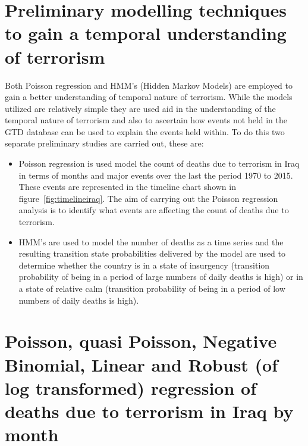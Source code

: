 \section{Preliminary modelling techniques to gain a temporal understanding of terrorism}
Both Poisson regression and HMM's (Hidden Markov Models) are employed to gain a better understanding of temporal nature of terrorism. While the models utilized are relatively simple they are used aid in the understanding of the temporal nature of terrorism and also to ascertain how events not held in the GTD database can be used to explain the events held within. To do this two separate preliminary studies are carried out, these are:
\begin{itemize}
\item Poisson regression is used model the count of deaths due to terrorism in Iraq in terms of months and major events over the last the period 1970 to 2015. These events are  represented in the timeline chart shown in figure~\ref{fig:timelineiraq}. The aim of carrying out the Poisson regression analysis is to identify what events are affecting the count of deaths due to terrorism. 
\item HMM's are used to model the number of deaths as a time series and the resulting transition state probabilities delivered by the model are used to determine whether the country is in a state of insurgency (transition probability of being in a period of large numbers of daily deaths is high) or in a state of relative calm (transition probability of being in a period of low numbers of daily deaths is high).
\end{itemize}

\section{Poisson, quasi Poisson, Negative Binomial, Linear  and Robust (of log transformed)  regression of deaths due to terrorism in Iraq by month}


